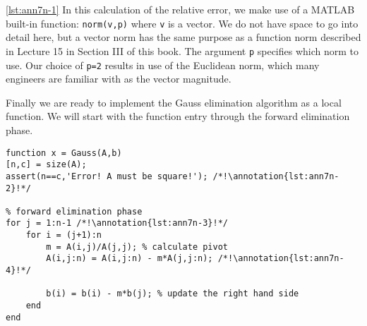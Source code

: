 \vspace{0.1cm}

\noindent \ref{lst:ann7n-1} In this calculation of the relative error, we make use of a MATLAB built-in function: \lstinline[style=myMatlab]{norm(v,p)} where \lstinline[style=myMatlab]{v} is a vector.  We do not have space to go into detail here, but a vector norm has the same purpose as a function norm described in Lecture 15 in Section III of this book. The argument \lstinline[style=myMatlab]{p} specifies which norm to use.  Our choice of \lstinline[style=myMatlab]{p=2} results in use of the Euclidean norm, which many engineers are familiar with as the vector magnitude.

\vspace{0.25cm}

\noindent Finally we are ready to implement the Gauss elimination algorithm as a local function. We will start with the function entry through the forward elimination phase. 
\begin{lstlisting}[style=myMatlab, name=lec7n-ex1]
%% Local function implementing Gauss Elimination
function x = Gauss(A,b)
[n,c] = size(A);
assert(n==c,'Error! A must be square!'); /*!\annotation{lst:ann7n-2}!*/

% forward elimination phase
for j = 1:n-1 /*!\annotation{lst:ann7n-3}!*/
    for i = (j+1):n 
        m = A(i,j)/A(j,j); % calculate pivot
        A(i,j:n) = A(i,j:n) - m*A(j,j:n); /*!\annotation{lst:ann7n-4}!*/
        
        b(i) = b(i) - m*b(j); % update the right hand side
    end
end
\end{lstlisting}
